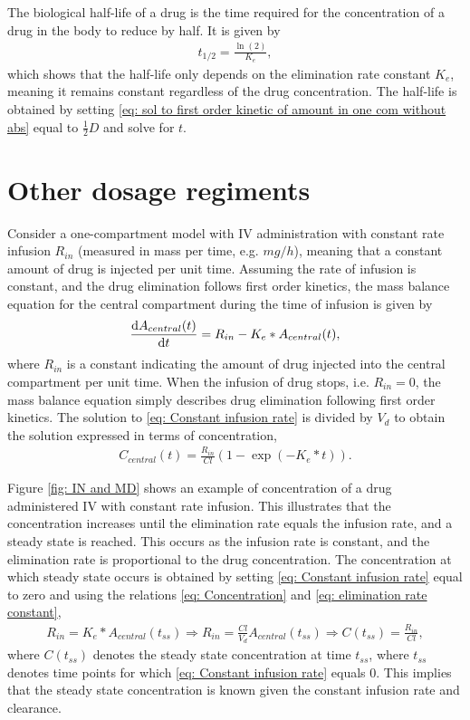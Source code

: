 The biological half-life of a drug is the time required for the concentration of a drug in the body to reduce by half. It is given by 
\begin{align}
    t_{1/2} = \frac{\ln(2)}{K_e},
\end{align}
which shows that the half-life only depends on the elimination rate constant $K_e$, meaning it remains constant regardless of the drug concentration. The half-life is obtained by setting \eqref{eq: sol to first order kinetic of amount in one com without abs} equal to $\frac{1}{2}D$ and solve for $t$. 




\section{Other dosage regiments}
\label{app: other dosage regimen}
Consider a one-compartment model with IV administration with constant rate infusion $R_{in}$ (measured in mass per time, e.g. $mg/h$), meaning that a constant amount of drug is injected per unit time. Assuming the rate of infusion is constant, and the drug elimination follows first order kinetics, the mass balance equation for the central compartment during the time of infusion is given by
\begin{align} \label{eq: Constant infusion rate}
    \frac{\mathrm{d} A_{central}(t)}{\mathrm{d}t}=R_{in}-K_e*A_{central}(t), 
\end{align}
where $R_{in}$ is a constant indicating the amount of drug injected into the central compartment per unit time. When the infusion of drug stops, i.e. $R_{in}=0$, the mass balance equation simply describes drug elimination following first order kinetics. The solution to \eqref{eq: Constant infusion rate} is divided by $V_d$ to obtain the solution expressed in terms of concentration,
\begin{align*}
    C_{central}(t) = \frac{R_{in}}{Cl}\left(1-\exp\left(-K_e * t\right)\right).
\end{align*}

Figure \ref{fig: IN and MD} shows an example of concentration of a drug administered IV with constant rate infusion. This illustrates that the concentration increases until the elimination rate equals the infusion rate, and a steady state is reached. This occurs as the infusion rate is constant, and the elimination rate is proportional to the drug concentration. The concentration at which steady state occurs is obtained by setting \eqref{eq: Constant infusion rate} equal to zero and using the relations \eqref{eq: Concentration} and \eqref{eq: elimination rate constant},
\begin{align*}
    R_{in} = K_e * A_{central}(t_{ss}) \Longrightarrow R_{in} = \frac{Cl}{V_d}A_{central}(t_{ss}) \Longrightarrow
    C(t_{ss}) = \frac{R_{in}}{Cl},
\end{align*}
where $C(t_{ss})$ denotes the steady state concentration at time $t_{ss}$, where $t_{ss}$ denotes time points for which \eqref{eq: Constant infusion rate} equals $0$. This implies that the steady state concentration is known given the constant infusion rate and clearance.

